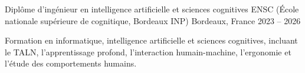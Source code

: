 
\begin{cventries}
  \cventry
    {Diplôme d’ingénieur en intelligence artificielle et sciences cognitives}
    {ENSC (École nationale supérieure de cognitique, Bordeaux INP)}
    {Bordeaux, France}
    {2023 -- 2026}
    {
      \begin{cvitems}
        \item {Formation en informatique, intelligence artificielle et sciences cognitives, incluant le TALN, l’apprentissage profond, l’interaction humain-machine, l’ergonomie et l’étude des comportements humains.}
      \end{cvitems}
    }
\end{cventries}

